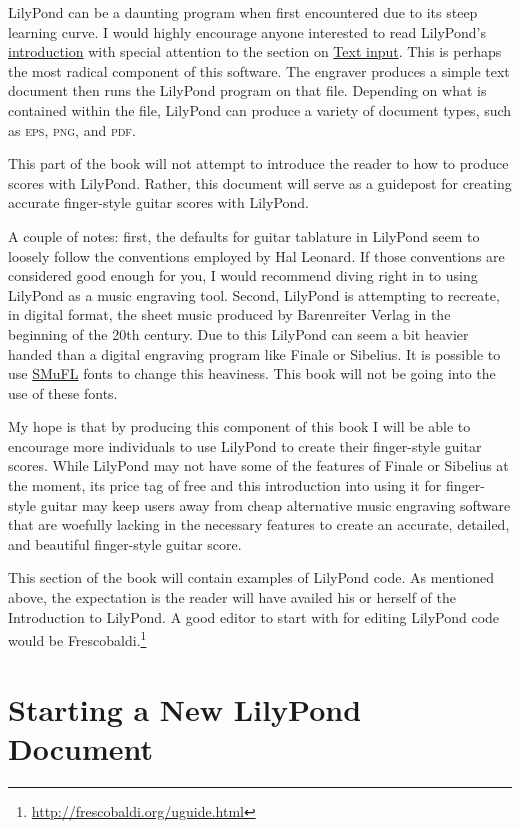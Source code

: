 \documentclass[]{memoir}
\begin{document}
LilyPond can be a daunting program when first encountered due to its
steep learning curve. I would highly encourage anyone interested to
read LilyPond's
\href{http://lilypond.org/introduction.html}{introduction} with
special attention to the section on
\href{http://lilypond.org/text-input.html}{Text input}. This is
perhaps the most radical component of this software. The engraver
produces a simple text document then runs the LilyPond program on that
file. Depending on what is contained within the file, LilyPond can
produce a variety of document types, such as \textsc{eps},
\textsc{png}, and \textsc{pdf}.

This part of the book will not attempt to introduce the reader to how
to produce scores with LilyPond. Rather, this document will serve as a
guidepost for creating accurate finger-style guitar scores with
LilyPond.

A couple of notes: first, the defaults for guitar tablature in
LilyPond seem to loosely follow the conventions employed by Hal
Leonard. If those conventions are considered good enough for you, I
would recommend diving right in to using LilyPond as a music engraving
tool. Second, LilyPond is attempting to recreate, in digital format,
the sheet music produced by Barenreiter Verlag in the beginning of the
20th century. Due to this LilyPond can seem a bit heavier handed than
a digital engraving program like Finale or Sibelius. It is possible to
use \href{https://www.smufl.org/}{SMuFL} fonts to change this
heaviness. This book will not be going into the use of these fonts.

My hope is that by producing this component of this book I will be
able to encourage more individuals to use LilyPond to create their
finger-style guitar scores. While LilyPond may not have some of the
features of Finale or Sibelius at the moment, its price tag of free
and this introduction into using it for finger-style guitar may keep
users away from cheap alternative music engraving software that are
woefully lacking in the necessary features to create an accurate,
detailed, and beautiful finger-style guitar score.

This section of the book will contain examples of LilyPond code. As
mentioned above, the expectation is the reader will have availed his
or herself of the Introduction to LilyPond. A good editor to start
with for editing LilyPond code would be
Frescobaldi.\footnote{\url{http://frescobaldi.org/uguide.html}}

\chapter{Starting a New LilyPond Document}
\label{cha:start-new-lilyp}
\end{document}
